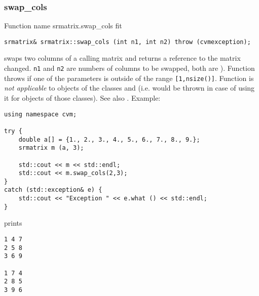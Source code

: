 \subsubsection{swap\_cols}
Function%
\pdfdest name {srmatrix.swap_cols} fit
\begin{verbatim}
srmatrix& srmatrix::swap_cols (int n1, int n2) throw (cvmexception);
\end{verbatim}
swaps two columns of a calling matrix and returns a reference to
the matrix changed. \verb"n1" and \verb"n2" are
 numbers of columns to be swapped, 
both are \Based).
Function throws  
if one of the parameters is outside of the range
\verb"[1,nsize()]".
Function is 
\emph{not applicable} to objects of the classes
 and
 (i.e.  would be thrown
in case of using it for objects of those classes).
See also .
Example:
\begin{Verbatim}
using namespace cvm;

try {
    double a[] = {1., 2., 3., 4., 5., 6., 7., 8., 9.};
    srmatrix m (a, 3);

    std::cout << m << std::endl;
    std::cout << m.swap_cols(2,3);
}
catch (std::exception& e) {
    std::cout << "Exception " << e.what () << std::endl;
}
\end{Verbatim}
prints
\begin{Verbatim}
1 4 7
2 5 8
3 6 9

1 7 4
2 8 5
3 9 6
\end{Verbatim}
\newpage





